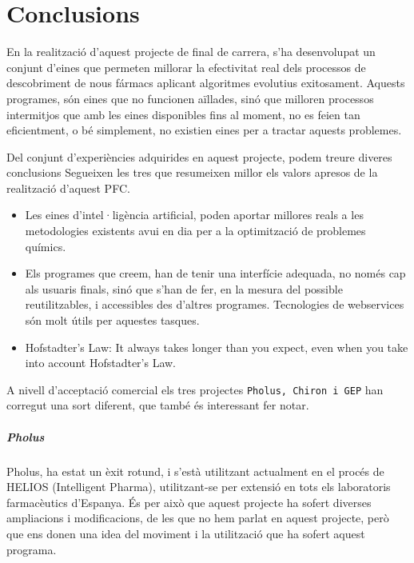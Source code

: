 \chapter{Conclusions} %
\label{cha:Conclusions}

En la realització d'aquest projecte de final de carrera, s'ha desenvolupat un
conjunt d'eines que permeten millorar la efectivitat real dels processos de
descobriment de nous fármacs aplicant algoritmes evolutius exitosament.
Aquests programes, són eines que no funcionen aïllades, sinó que milloren
processos intermitjos que amb les eines disponibles fins al moment, no es feien
tan eficientment, o bé simplement, no existien eines per a tractar aquests
problemes.

Del conjunt d'experiències adquirides en aquest projecte, podem treure diveres
conclusions  Segueixen les tres que resumeixen millor els valors apresos de la
realització d'aquest PFC.

\begin{itemize}
	\item Les eines d'intel·ligència artificial, poden aportar millores reals a
		les metodologies existents avui en dia per a la optimització de
		problemes químics.
	\item Els programes que creem, han de tenir una interfície adequada, no
		només cap als usuaris finals, sinó que s'han de fer, en la mesura del
		possible reutilitzables, i accessibles des d'altres programes.
		Tecnologies de webservices són molt útils per aquestes tasques.
	\item Hofstadter's Law: It always takes longer than you expect, even when
		you take into account Hofstadter's Law. \cite{GEB79}
\end{itemize}

A nivell d'acceptació comercial els tres projectes \texttt{Pholus, Chiron i GEP}
han corregut una sort diferent, que també és interessant fer notar.

\paragraph{Pholus} %
\label{par:Pholus}

Pholus, ha estat un èxit rotund, i s'està utilitzant actualment en el procés de
HELIOS (Intelligent Pharma), utilitzant-se per extensió en tots els laboratoris
farmacèutics d'Espanya.  És per això que aquest projecte ha sofert diverses
ampliacions i modificacions, de les que no hem parlat en aquest projecte, però
que ens donen una idea del moviment i la utilització que ha sofert aquest
programa.

